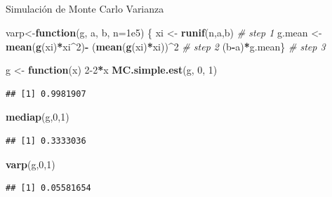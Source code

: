 \documentclass[
  ignorenonframetext,
]{beamer}
\newenvironment{Shaded}{\begin{snugshade}}{\end{snugshade}}
\newcommand{\CommentTok}[1]{\textcolor[rgb]{0.56,0.35,0.01}{\textit{#1}}}
\newcommand{\ControlFlowTok}[1]{\textcolor[rgb]{0.13,0.29,0.53}{\textbf{#1}}}
\newcommand{\DataTypeTok}[1]{\textcolor[rgb]{0.13,0.29,0.53}{#1}}
\newcommand{\DecValTok}[1]{\textcolor[rgb]{0.00,0.00,0.81}{#1}}
\newcommand{\FloatTok}[1]{\textcolor[rgb]{0.00,0.00,0.81}{#1}}
\newcommand{\KeywordTok}[1]{\textcolor[rgb]{0.13,0.29,0.53}{\textbf{#1}}}
\newcommand{\NormalTok}[1]{#1}
\newcommand{\OperatorTok}[1]{\textcolor[rgb]{0.81,0.36,0.00}{\textbf{#1}}}
\newcommand{\StringTok}[1]{\textcolor[rgb]{0.31,0.60,0.02}{#1}}
\begin{document}
\hypertarget{section-7}{%
\subsection{}\label{section-7}}

\begin{frame}[fragile]{}

Simulación de Monte Carlo Varianza

\begin{Shaded}
\begin{Highlighting}[]
\NormalTok{varp<-}\ControlFlowTok{function}\NormalTok{(g, a, b, }\DataTypeTok{n=}\FloatTok{1e5}\NormalTok{) \{}
\NormalTok{    xi <-}\StringTok{ }\KeywordTok{runif}\NormalTok{(n,a,b)     }\CommentTok{# step 1}
\NormalTok{    g.mean <-}\StringTok{ }\KeywordTok{mean}\NormalTok{(}\KeywordTok{g}\NormalTok{(xi)}\OperatorTok{*}\NormalTok{xi}\OperatorTok{^}\DecValTok{2}\NormalTok{)}\OperatorTok{-}
\StringTok{      }\NormalTok{(}\KeywordTok{mean}\NormalTok{(}\KeywordTok{g}\NormalTok{(xi)}\OperatorTok{*}\NormalTok{xi))}\OperatorTok{^}\DecValTok{2}   \CommentTok{# step 2}
\NormalTok{    (b}\OperatorTok{-}\NormalTok{a)}\OperatorTok{*}\NormalTok{g.mean\}          }\CommentTok{# step 3}
\end{Highlighting}
\end{Shaded}

\begin{Shaded}
\begin{Highlighting}[]
\NormalTok{ g <-}\StringTok{ }\ControlFlowTok{function}\NormalTok{(x) }\DecValTok{2-2}\OperatorTok{*}\NormalTok{x}
 \KeywordTok{MC.simple.est}\NormalTok{(g, }\DecValTok{0}\NormalTok{, }\DecValTok{1}\NormalTok{)}
\end{Highlighting}
\end{Shaded}

\begin{verbatim}
## [1] 0.9981907
\end{verbatim}

\begin{Shaded}
\begin{Highlighting}[]
 \KeywordTok{mediap}\NormalTok{(g,}\DecValTok{0}\NormalTok{,}\DecValTok{1}\NormalTok{)}
\end{Highlighting}
\end{Shaded}

\begin{verbatim}
## [1] 0.3333036
\end{verbatim}

\begin{Shaded}
\begin{Highlighting}[]
 \KeywordTok{varp}\NormalTok{(g,}\DecValTok{0}\NormalTok{,}\DecValTok{1}\NormalTok{)}
\end{Highlighting}
\end{Shaded}

\begin{verbatim}
## [1] 0.05581654
\end{verbatim}

\end{frame}
\end{document}
